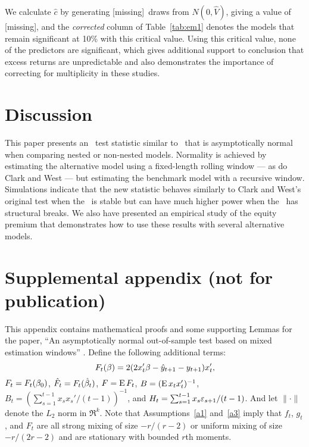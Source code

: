 \documentclass[12pt,fleqn]{article}
\providecommand\empiricalcriticalvalue{[missing]}
\providecommand\empiricaldraws{[missing]}
\providecommand\phantomsection{}
\begin{document}
We calculate $\hat c$ by generating \empiricaldraws\ draws from
$N(0,\hat V)$, giving a value of \empiricalcriticalvalue, and the
\emph{corrected} column of Table~\ref{tab:em1} denotes the models that
remain significant at 10\% with this critical value. Using this
critical value, none of the predictors are significant, which
gives additional support to  conclusion that excess
returns are unpredictable and also demonstrates the importance of
correcting for multiplicity in these studies.

\section{Discussion}\label{sec:4}
This paper presents an \oos\ test statistic similar to \poscw\ that is
asymptotically normal when comparing nested or non-nested models.
Normality is achieved by estimating the alternative model using a
fixed-length rolling window --- as do Clark and West --- but
estimating the benchmark model with a recursive window.  Simulations
indicate that the new statistic behaves similarly to Clark and West's
original test when the \dgp\ is stable but can have much higher power
when the \dgp\ has structural breaks. We also have presented an
empirical study of the equity premium that demonstrates how to use
these results with several alternative models.

\newpage
\phantomsection
{}


\newpage
\appendix
\section{Supplemental appendix (not for publication)}
\newcommand{\WesA}[1][]{\ocltb{t}
  (F_t^{#1} - F) B^{#1} H_t^{#1}}
\newcommand{\WesB}[1][]{\ocltb{t} F (B_t^{#1} -
  B^{#1}) H_t^{#1}}
\newcommand{\WesC}[1][]{\ocltb{t}
  (F_t^{#1} - F) (B_t^{#1} - B^{#1}) H_t^{#1}}

This appendix contains mathematical proofs and some supporting Lemmas
for the paper, ``An asymptotically normal out-of-sample test based on
mixed estimation windows'' \citep{Cal:15}. Define the following
additional terms:
\begin{equation*}
  F_t(\beta) = 2 (2 x_t'\beta - \hat{y}_{t+1} - y_{t+1}) x_t',
\end{equation*}
$F_t = F_t(\btrue)$, $\hat{F}_t = F_t(\hat{\beta}_t)$, $F = \operatorname{E} F_t$, $B = (\operatorname{E} x_t
x_t')^{-1}$, $B_t = (\sum_{s=1}^{t-1} x_s x_s' / (t-1))^{-1}$, and
$H_t = \sum_{s=1}^{t-1} x_s \varepsilon_{s+1} / (t-1)$.
And let $\lVert \cdot \rVert$ denote the $L_2$ norm in $\Re^k$.
Note that Assumptions~\ref{a1} and~\ref{a3} imply that $f_t$, $g_t$,
and $F_t$ are all strong mixing of size $-r/(r-2)$ or uniform mixing
of size $-r/(2r-2)$ and are stationary with bounded $r$th moments.
\end{document}
